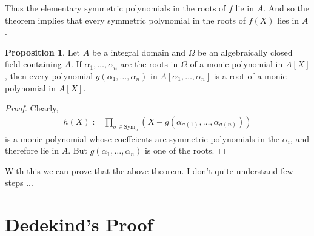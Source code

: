 \documentclass[a4paper]{book}
\theoremstyle{definition}
\newtheorem{proposition}[definition]{Proposition}
\begin{document}
Thus the elementary symmetric polynomials in the roots of \(f\) lie in \(A\). And so the theorem implies that every symmetric polynomial in the roots of \(f(X)\) lies in \(A\).
\begin{thmbox}
    \begin{proposition}
        Let \(A\) be a integral domain and \(\Omega\) be an algebraically closed field containing \(A\). If \(\alpha_1, \ldots, \alpha_n\) are the roots in \(\Omega\) of a monic polynomial in \(A[X]\), then every polynomial \(g(\alpha_1, \ldots, \alpha_n)\) in \(A[\alpha_1, \ldots, \alpha_n]\) is a root of a monic polynomial in \(A[X]\).
    \end{proposition}
\end{thmbox}
\begin{proof}
    Clearly,
    \begin{align*}
        h(X) := \prod_{\sigma \in \mathrm{Sym}_n} (X -  g(\alpha_{\sigma(1)}, \ldots, \alpha_{\sigma(n  )}))
    \end{align*}
    is a monic polynomial whose coeffcients are symmetric polynomials in the \(\alpha_i\), and therefore lie in \(A\). But \(g(\alpha_1, \ldots, \alpha_n)\) is one of the roots.
\end{proof}
With this we can prove that the above theorem. I don't quite understand few steps ...

\section*{Dedekind's Proof}
\end{document}
